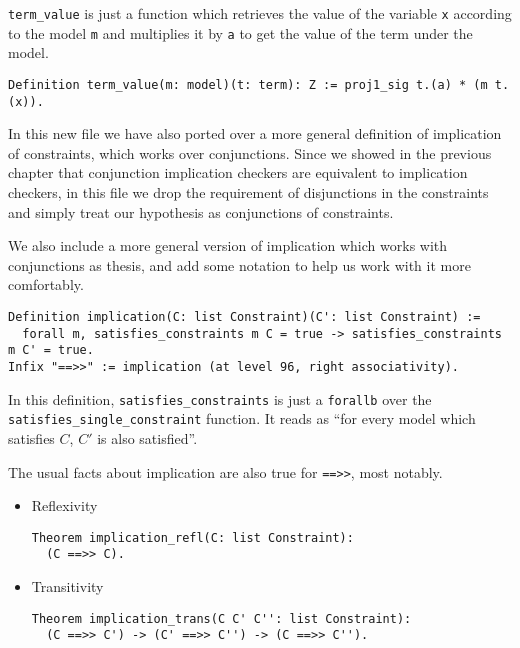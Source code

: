 \texttt{term_value} is just a function which retrieves the value of the variable 
\texttt{x} according to the model \texttt{m} and multiplies it by \texttt{a}
to get the value of the term under the model.

\begin{verbatim}
Definition term_value(m: model)(t: term): Z := proj1_sig t.(a) * (m t.(x)).
\end{verbatim}



In this new file we have also ported over a more general definition of implication of
constraints, which works over conjunctions. Since we showed in the previous chapter
that conjunction implication checkers are equivalent to implication checkers, in this
file we drop the requirement of disjunctions in the constraints and simply treat our
hypothesis as conjunctions of constraints.

We also include a more general version of implication which works with conjunctions as
thesis, and add some notation to help us work with it more comfortably.

\begin{verbatim}
Definition implication(C: list Constraint)(C': list Constraint) :=
  forall m, satisfies_constraints m C = true -> satisfies_constraints m C' = true.
Infix "==>>" := implication (at level 96, right associativity).
\end{verbatim}

In this definition, \texttt{satisfies_constraints} is just a \texttt{forallb}
over the \texttt{satisfies_single_constraint} function. It reads as ``for every model
which satisfies $C$, $C'$ is also satisfied''.

The usual facts about implication are also true for \texttt{==>>}, most notably.

\begin{itemize}
    \item Reflexivity
\begin{verbatim}
Theorem implication_refl(C: list Constraint):
  (C ==>> C).
\end{verbatim}

    \item Transitivity
\begin{verbatim}
Theorem implication_trans(C C' C'': list Constraint):
  (C ==>> C') -> (C' ==>> C'') -> (C ==>> C'').
\end{verbatim}
  
\end{itemize}

